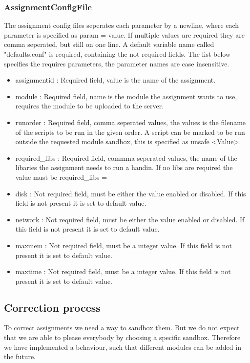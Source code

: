 \subsubsection{AssignmentConfigFile}
\label{sec:assignment}
The assignment config files seperates each parameter by a newline, where each parameter is specified as param = value. If multiple values are required they are comma seperated, but still on one line. A default variable name called "defaults.conf" is required, containing the not required fields.
The list below specifies the requires parameters, the parameter names are case insensitive.
\begin{itemize}
    \item assignmentid : Required field, value is the name of the assignment.
    \item module : Required field, name is the module the assignment wants to use, requires the module to be uploaded to the server.
    \item runorder : Required field, comma seperated values, the values is the filename of the scripts to be run in the given order. A script can be marked to be run outside the requested module sandbox, this is specified as unsafe <Value>.
    \item required\_libs : Required field, commma seperated values, the name of the libaries the assignment needs to run a handin. If no libs are required the value must be required\_libs =
    \item disk : Not required field, must be either the value enabled or disabled. If this field is not present it is set to default value.
    \item network : Not required field, must be either the value enabled or disabled. If this field is not present it is set to default value.
    \item maxmem : Not required field, must be a integer value. If this field is not present it is set to default value.
    \item maxtime : Not required field, must be a integer value. If this field is not present it is set to default value.
\end{itemize}



\subsection{Correction process}
To correct assignments we need a way to sandbox them. But we do not expect that
we are able to please everybody by choosing a specific sandbox. Therefore we
have implemented a behaviour, such that different modules can be added in the
future.

